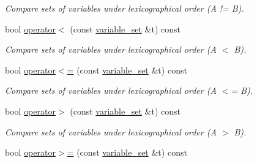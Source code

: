 \begin{DoxyCompactItemize}
\begin{DoxyCompactList}\small\item\em Compare sets of variables under lexicographical order (A != B). \end{DoxyCompactList}\item 
\hypertarget{classmerlin_1_1variable__set_a8862b4409496bc7f4bbf75619b6ac4d1}{}bool \hyperlink{classmerlin_1_1variable__set_a8862b4409496bc7f4bbf75619b6ac4d1}{operator$<$} (const \hyperlink{classmerlin_1_1variable__set}{variable\+\_\+set} \&t) const \label{classmerlin_1_1variable__set_a8862b4409496bc7f4bbf75619b6ac4d1}

\begin{DoxyCompactList}\small\item\em Compare sets of variables under lexicographical order (A $<$ B). \end{DoxyCompactList}\item 
\hypertarget{classmerlin_1_1variable__set_a97e17e16c32ec7f1a90c5df1586c50c0}{}bool \hyperlink{classmerlin_1_1variable__set_a97e17e16c32ec7f1a90c5df1586c50c0}{operator$<$=} (const \hyperlink{classmerlin_1_1variable__set}{variable\+\_\+set} \&t) const \label{classmerlin_1_1variable__set_a97e17e16c32ec7f1a90c5df1586c50c0}

\begin{DoxyCompactList}\small\item\em Compare sets of variables under lexicographical order (A $<$= B). \end{DoxyCompactList}\item 
\hypertarget{classmerlin_1_1variable__set_ae5a0319dd097786bf5000ad29ef68c29}{}bool \hyperlink{classmerlin_1_1variable__set_ae5a0319dd097786bf5000ad29ef68c29}{operator$>$} (const \hyperlink{classmerlin_1_1variable__set}{variable\+\_\+set} \&t) const \label{classmerlin_1_1variable__set_ae5a0319dd097786bf5000ad29ef68c29}

\begin{DoxyCompactList}\small\item\em Compare sets of variables under lexicographical order (A $>$ B). \end{DoxyCompactList}\item 
\hypertarget{classmerlin_1_1variable__set_acf30f484b7ea666dab42908178c189ec}{}bool \hyperlink{classmerlin_1_1variable__set_acf30f484b7ea666dab42908178c189ec}{operator$>$=} (const \hyperlink{classmerlin_1_1variable__set}{variable\+\_\+set} \&t) const \label{classmerlin_1_1variable__set_acf30f484b7ea666dab42908178c189ec}


\end{DoxyCompactItemize}
